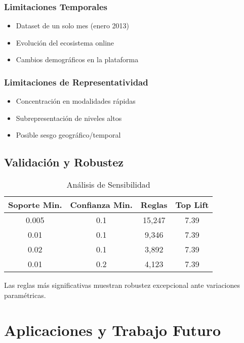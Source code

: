 \documentclass[11pt,a4paper]{article}
\begin{document}
\subsubsection{Limitaciones Temporales}
\begin{itemize}
\item Dataset de un solo mes (enero 2013)
\item Evoluci\'on del ecosistema online
\item Cambios demogr\'aficos en la plataforma
\end{itemize}

\subsubsection{Limitaciones de Representatividad}
\begin{itemize}
\item Concentraci\'on en modalidades r\'apidas
\item Subrepresentaci\'on de niveles altos
\item Posible sesgo geogr\'afico/temporal
\end{itemize}

\subsection{Validaci\'on y Robustez}

\begin{table}[H]
\centering
\caption{An\'alisis de Sensibilidad}
\label{tab:sensitivity}
\begin{tabular}{@{}cccc@{}}
\toprule
\textbf{Soporte Min.} & \textbf{Confianza Min.} & \textbf{Reglas} & \textbf{Top Lift} \\
\midrule
0.005 & 0.1 & 15,247 & 7.39 \\
0.01 & 0.1 & 9,346 & 7.39 \\
0.02 & 0.1 & 3,892 & 7.39 \\
0.01 & 0.2 & 4,123 & 7.39 \\
\bottomrule
\end{tabular}
\end{table}

Las reglas m\'as significativas muestran robustez excepcional ante variaciones param\'etricas.

\section{Aplicaciones y Trabajo Futuro}
\end{document}
